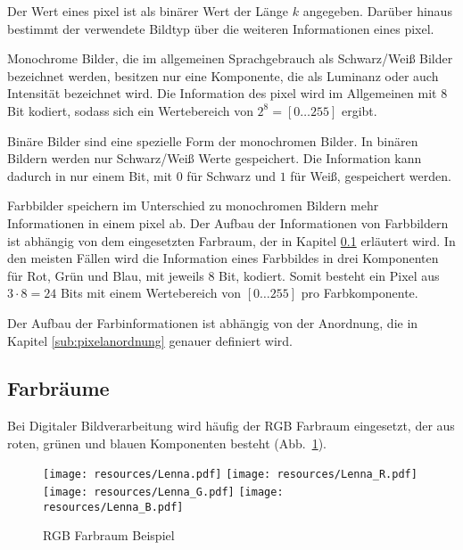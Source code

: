 Der Wert eines \gls{pixel} ist als binärer Wert der Länge $k$ angegeben. Darüber hinaus bestimmt der verwendete Bildtyp über die weiteren Informationen eines \gls{pixel}.

Monochrome Bilder, die im allgemeinen Sprachgebrauch als Schwarz/Weiß Bilder bezeichnet werden, besitzen nur eine Komponente, die als Luminanz oder auch Intensität bezeichnet wird. Die Information des \gls{pixel} wird im Allgemeinen mit 8 Bit kodiert, sodass sich ein Wertebereich von $2^8 = \left[0\dotsc255\right]$ ergibt.

Binäre Bilder sind eine spezielle Form der monochromen Bilder. In binären Bildern werden nur Schwarz/Weiß Werte gespeichert. Die Information kann dadurch in nur einem Bit, mit $0$ für Schwarz und $1$ für Weiß, gespeichert werden.

Farbbilder speichern im Unterschied zu monochromen Bildern mehr Informationen in einem \gls{pixel} ab. Der Aufbau der
Informationen von Farbbildern ist abhängig von dem eingesetzten Farbraum, der in Kapitel \ref{sub:farbräume} erläutert
wird. In den meisten Fällen wird die Information eines Farbbildes in drei Komponenten für Rot, Grün und Blau, mit
jeweils 8 Bit, kodiert. Somit besteht ein Pixel aus \(3 \cdot 8 = 24\) Bits mit einem Wertebereich von
\(\left[0 \dotsc 255\right]\) pro Farbkomponente.

Der Aufbau der Farbinformationen ist abhängig von der Anordnung, die in Kapitel \ref{sub:pixelanordnung} genauer definiert wird.


\subsection{Farbräume} %
\label{sub:farbräume}

Bei Digitaler Bildverarbeitung wird häufig der RGB Farbraum eingesetzt, der aus roten, grünen und blauen Komponenten besteht (Abb.~\ref{fig:rgbLenna}).

\begin{figure}[!ht]
	\centering
	\texttt{[image: resources/Lenna.pdf]}
	\texttt{[image: resources/Lenna\_R.pdf]}
	\texttt{[image: resources/Lenna\_G.pdf]}
	\texttt{[image: resources/Lenna\_B.pdf]}
	\caption{RGB Farbraum Beispiel}
	\label{fig:rgbLenna}
\end{figure}

